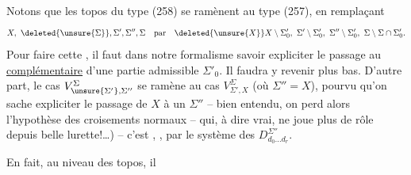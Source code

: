 Notons que les topos du type (258) se ramènent au type (257), en remplaçant
\[
X,\ \deleted{\unsure{\Sigma}},\Sigma',\Sigma'',\Sigma\quad\text{par}\quad
\deleted{\unsure{X}}X\setminus\Sigma'_0,\ \Sigma'\setminus\Sigma'_0,\ \Sigma''\setminus\Sigma'_0,\ \Sigma\setminus\Sigma\cap\Sigma'_0.
\]
Pour faire cette , il faut dans notre formalisme savoir expliciter \margin{$\Vert$} le passage au  \uline{complémentaire} d'une partie admissible $\Sigma'_0$. Il faudra y revenir plus bas. D'autre part, le cas $V_{\unsure{\Sigma'},\Sigma''}^{\Sigma}$ se ramène au cas $V_{\Sigma',X}^{\Sigma}$ (où $\Sigma''=X$), pourvu qu'on sache expliciter le passage de $X$ à un $\Sigma''$ -- bien entendu, on perd alors l'hypothèse des croisements normaux -- qui, à dire vrai,  ne joue plus de rôle depuis belle lurette!\ldots) -- c'est , , par le système des $D_{d_0\ldots d_r}^{\Sigma''}$. 

En fait, au niveau des topos, il
